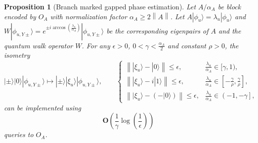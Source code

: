 \documentclass[letterpaper,onecolumn,11pt,accepted=2026-02-14]{quantumarticle}
\newcommand{\norm}[1]{\left\lVert#1\right\rVert}
\newtheorem{proposition}[lemma]{Proposition}
\theoremstyle{remark}
\theoremstyle{plain}
\newcommand{\ket}[1]{|#1\rangle}
\begin{document}
\begin{proposition}[Branch marked gapped phase estimation]
\label{prop:gpe}
Let $A/\alpha_A$ be block encoded by $O_A$ with normalization factor $\alpha_A\geq2\norm{A}$. 
Let $A\ket{\phi_u}=\lambda_u\ket{\phi_u}$ and $W\ket{\phi_{u,Y\pm}}= e^{\pm i\arccos\left(\frac{\lambda_u}{\alpha_A}\right)}\ket{\phi_{u,Y\pm}}$ be the corresponding eigenpairs of $A$ and the quantum walk operator $W$.
For any $\epsilon>0$, $0<\gamma<\frac{\alpha_A}{2}$ and constant $\rho>0$, the isometry
\begin{equation}
    \ket{\pm}\ket{0}\ket{\phi_{u,Y\pm}}\mapsto\ket{\pm}\ket{\xi_{u}}\ket{\phi_{u,Y\pm}},\qquad
\begin{cases}
    \norm{\ket{\xi_{u}}-\ket{0}}\leq\epsilon,\quad&\frac{\lambda_u}{\alpha_A}\in[\gamma,1),\\
    \norm{\ket{\xi_{u}}-i\ket{1}}\leq\epsilon,&\frac{\lambda_u}{\alpha_A}\in\left[-\frac{\gamma}{\rho},\frac{\gamma}{\rho}\right],\\
    \norm{\ket{\xi_{u}}-(-\ket{0})}\leq\epsilon,&\frac{\lambda_u}{\alpha_A}\in\left(-1,-\gamma\right],
\end{cases}
\end{equation}
can be implemented 
using
    \begin{equation}
        \mathbf{O}\left(\frac{1}{\gamma}\log\left(\frac{1}{\epsilon}\right)\right)
    \end{equation}
    queries to $O_A$.
\end{proposition}
\end{document}
